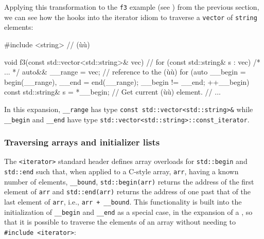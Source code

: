 {{Applying this transformation to the \lstinline!f3! example (see \pageref{iterating-over-std::vector-with-a-range-based-for-loop}) from the previous section, we can see how the
 hooks into the iterator idiom to
traverse a \lstinline!vector! of \lstinline!string! elements:

\begin{emcppslisting}
#include <string>  // (ù{}ù)

void f3(const std::vector<std::string>& vec)
{
    // for (const std::string& s : vec) { /* ... */ }
    {
        auto&& __range = vec;  // reference to the (ù{}ù)
        for (auto __begin = begin(__range), __end = end(__range);
            __begin != __end;
            ++__begin)
        {
            const std::string& s = *__begin;  // Get current (ù{}ù) element.
            {
                // ...
            }
        }
    }
}
\end{emcppslisting}
    

\noindent In this expansion, \lstinline!__range! has type
\lstinline!const!~\lstinline!std::vector<std::string>&! while
\lstinline!__begin! and \lstinline!__end! have type
\lstinline!std::vector<std::string>::const_iterator!.

\subsubsection[Traversing arrays and initializer lists]{Traversing arrays and initializer lists}\label{traversing-arrays-and-initializer-lists}

The \lstinline!<iterator>! standard header defines array overloads for
\lstinline!std::begin! and \lstinline!std::end! such that, when applied to a
C-style array, \lstinline!arr!, having a known number of elements,
\lstinline!__bound!, \lstinline!std::begin(arr)! returns the address of the
first element of \lstinline!arr! and \lstinline!std::end(arr)! returns the
address of one past that of the last element of \lstinline!arr!, i.e.,
\lstinline!arr!~\lstinline!+!~\lstinline!__bound!. This functionality is built
into the initialization of \lstinline!__begin! and \lstinline!__end! as a
special case, in the expansion of a , so that it is possible to traverse the elements of an array
without needing to \lstinline!#include!~\lstinline!<iterator>!:

}}
